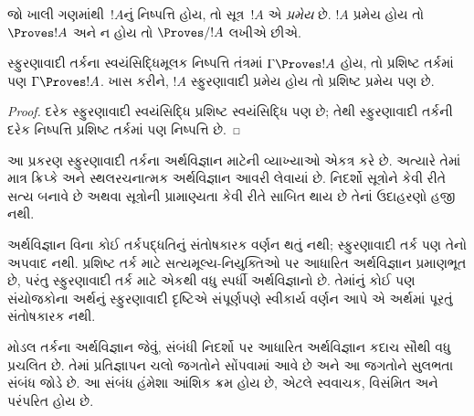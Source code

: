 \begin{defn}[પ્રમેયો]
જો ખાલી ગણમાંથી~$!A$નું નિષ્પત્તિ હોય, તો
સૂત્ર~$!A$ એ \emph{પ્રમેય} છે. $!A$ પ્રમેય
હોય તો $\Proves !A$ અને ન હોય તો $\Proves/ !A$ લખીએ છીએ.
\end{defn}

\begin{prop}
  સ્ફુરણાવાદી તર્કના સ્વયંસિદ્ધિમૂલક નિષ્પત્તિ તંત્રમાં
  $\Gamma \Proves !A$ હોય, તો પ્રશિષ્ટ તર્કમાં પણ
  $\Gamma \Proves !A$. ખાસ કરીને, $!A$ સ્ફુરણાવાદી
  પ્રમેય હોય તો પ્રશિષ્ટ પ્રમેય પણ છે.
\end{prop}

\begin{proof}
  દરેક સ્ફુરણાવાદી સ્વયંસિદ્ધિ પ્રશિષ્ટ સ્વયંસિદ્ધિ પણ છે;
  તેથી સ્ફુરણાવાદી તર્કની દરેક નિષ્પત્તિ પ્રશિષ્ટ
  તર્કમાં પણ નિષ્પત્તિ છે.
\end{proof}
\endgroup


\OLEndChapterHook
\endgroup


\begingroup
\makeatletter{}\makeatother

\label{guunit:OLP-0498}


\begin{editorial}
  આ પ્રકરણ સ્ફુરણાવાદી તર્કના અર્થવિજ્ઞાન માટેની વ્યાખ્યાઓ
  એકત્ર કરે છે. અત્યારે તેમાં માત્ર ક્રિપ્કે અને સ્થલરચનાત્મક
  અર્થવિજ્ઞાન આવરી લેવાયાં છે. નિદર્શો સૂત્રોને કેવી રીતે સત્ય
  બનાવે છે અથવા સૂત્રોની પ્રામાણ્યતા કેવી રીતે સાબિત થાય છે
  તેનાં ઉદાહરણો હજી નથી.
\end{editorial}

\begingroup
\makeatletter{}\makeatother


\label{guunit:OLP-0499}


અર્થવિજ્ઞાન વિના કોઈ તર્કપદ્ધતિનું સંતોષકારક વર્ણન થતું નથી;
સ્ફુરણાવાદી તર્ક પણ તેનો અપવાદ નથી. પ્રશિષ્ટ તર્ક માટે
સત્યમૂલ્ય-નિયુક્તિઓ પર આધારિત અર્થવિજ્ઞાન પ્રમાણભૂત છે, પરંતુ
સ્ફુરણાવાદી તર્ક માટે એકથી વધુ સ્પર્ધી અર્થવિજ્ઞાનો છે.
તેમાંનું કોઈ પણ સંયોજકોના અર્થનું સ્ફુરણાવાદી દૃષ્ટિએ
સંપૂર્ણપણે સ્વીકાર્ય વર્ણન આપે એ અર્થમાં પૂરતું સંતોષકારક નથી.

મોડલ તર્કના અર્થવિજ્ઞાન જેવું, સંબંધી નિદર્શો પર
આધારિત અર્થવિજ્ઞાન કદાચ સૌથી વધુ પ્રચલિત છે. તેમાં
પ્રતિજ્ઞાપન ચલો જગતોને સોંપવામાં આવે છે અને
આ જગતોને સુલભતા સંબંધ જોડે છે. આ સંબંધ હંમેશા આંશિક
ક્રમ હોય છે, એટલે સ્વવાચક, વિસંમિત અને પરંપરિત હોય છે.

